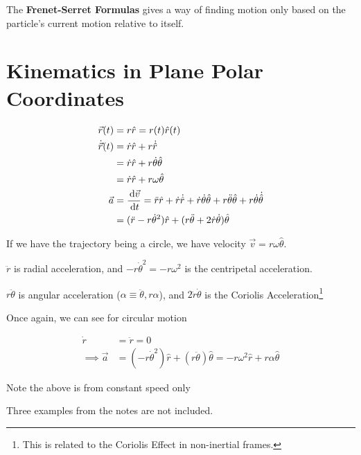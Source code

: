 \begin{remark}
	The \textbf{Frenet-Serret Formulas} gives a way of finding motion only based on the particle's current motion relative to itself.
\end{remark}

\section{Kinematics in Plane Polar Coordinates}

\begin{definition}
	\begin{align}
		\vec r(t) &= r \hat r = r(t) \hat r(t)\\
		\dot{\vec r}(t) &= \dot r \hat r + r \dot{\hat r}\\
		&= \dot r \hat r + r \dot \theta \hat \theta\\
		&= \dot r \hat r + r \omega \hat \theta\\
		\vec a &= \frac{\D \vec v}{\D t} = \ddot r \hat r + \dot r \dot{\hat r} + \dot r \dot \theta \hat \theta + r \ddot \theta \hat \theta + r \dot\theta \dot{\hat \theta}\\
		&= (\ddot r - r \dot \theta^2) \hat r + (r \ddot \theta + 2 \dot r \dot \theta) \hat \theta
	\end{align}
	
	\begin{remark}
		If we have the trajectory being a circle, we have velocity $\vec v = r\omega\hat\theta$.
	\end{remark}

	$\ddot r$ is radial acceleration, and $-r\dot\theta^2 = -r\omega^2$ is the centripetal acceleration.

	$r\ddot\theta$ is angular acceleration ($\alpha \equiv \ddot\theta, r\alpha$), and $2\dot r\dot\theta$ is the Coriolis Acceleration\footnote{This is related to the Coriolis Effect in non-inertial frames.}
\end{definition}

Once again, we can see for circular motion

\begin{align}
	\dot r &= \ddot r = 0\\
	\implies \vec a &= (-r\dot\theta^2) \hat r + (r\ddot\theta)	\hat \theta = -r\omega^2\hat r + r\alpha\hat\theta
\end{align}

Note the above is from constant speed only

\begin{remark}
	Three examples from the notes are not included.
\end{remark}